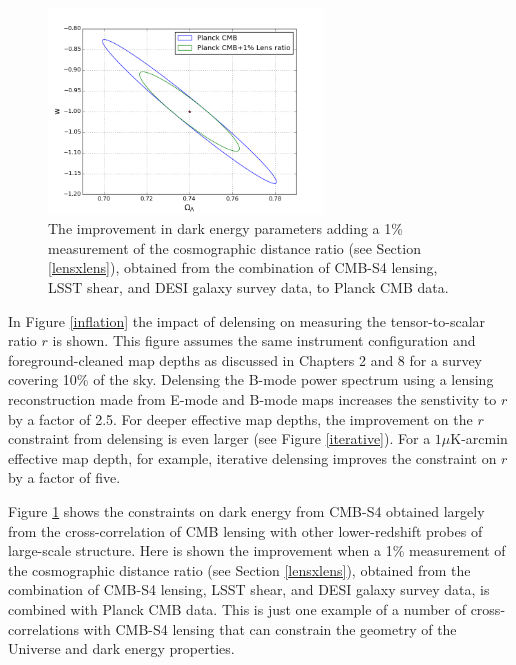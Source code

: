 \begin{figure}[htbp]
\centering
\includegraphics[width=0.65\textwidth]{CMBLensing/Das_confEllipse_omL_w_1sigma.png}
\caption{The improvement in dark energy parameters adding a 1\% measurement of the cosmographic distance ratio (see Section \ref{lensxlens}), obtained from the combination of CMB-S4 lensing, LSST shear, and DESI galaxy survey data, to Planck CMB data.}
\label{darkEnergy}
\end{figure}

In Figure \ref{inflation} the impact of delensing on measuring the tensor-to-scalar ratio $r$ is shown.  This figure assumes the same instrument configuration and foreground-cleaned map depths as discussed in Chapters 2 and 8 for a survey covering 10\% of the sky.  Delensing the B-mode power spectrum using a lensing reconstruction made from E-mode and B-mode maps increases the senstivity to $r$ by a factor of 2.5.  For deeper effective map depths, the improvement on the $r$ constraint from delensing is even larger (see Figure \ref{iterative}).  For a $1 \mu $K-arcmin effective map depth, for example, iterative delensing improves the constraint on $r$ by a factor of five.  

Figure \ref{darkEnergy} shows the constraints on dark energy from CMB-S4 obtained largely from the cross-correlation of CMB lensing with other lower-redshift probes of large-scale structure.  Here is shown the improvement when a 1\% measurement of the cosmographic distance ratio (see Section \ref{lensxlens}), obtained from the combination of CMB-S4 lensing, LSST shear, and DESI galaxy survey data, is combined with Planck CMB data.  This is just one example of a number of cross-correlations with CMB-S4 lensing that can constrain the geometry of the Universe and dark energy properties.


%

%

